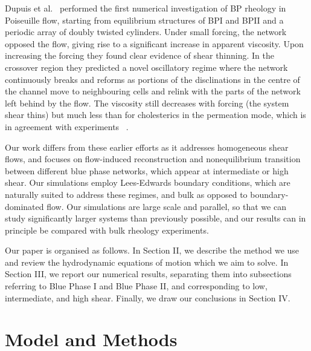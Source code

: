 \documentclass[8.5pt,twoside,twocolumn]{article}
\begin{document}
Dupuis et al.~\cite{Dupuis:2005} performed the first numerical investigation of BP rheology 
in Poiseuille flow, starting from equilibrium structures of BPI and BPII and a periodic 
array of doubly twisted cylinders.
Under small forcing, the network opposed the flow, giving rise to a significant 
increase in apparent viscosity.
Upon increasing the forcing they found clear evidence of shear thinning.
In the crossover region they predicted a novel oscillatory regime where the network 
continuously breaks and reforms as portions of the disclinations in the centre of the channel 
move to neighbouring cells and relink with the parts of the network left behind by the flow. 
The viscosity still decreases with forcing 
(the system shear thins) but much less than
for cholesterics in the permeation mode, which is in agreement with experiments
~\cite{Zapotocky:1999, Ramos:2002}.

Our work differs from these earlier efforts as it addresses homogeneous shear flows, 
and focuses on flow-induced reconstruction and nonequilibrium transition
between different blue phase networks, which appear at intermediate or
high shear. Our simulations employ Lees-Edwards boundary conditions, which
are naturally suited to address these regimes, and bulk as opposed
to boundary-dominated flow. 
Our simulations are large scale and parallel, so that we can study
significantly larger systems than previously possible, and our
results can in principle be compared with bulk rheology experiments. 

Our paper is organised as follows. 
In Section II, we describe the method we use and review
the hydrodynamic equations of motion which we aim to solve. In Section III, 
we report our numerical results, separating them into subsections referring to
Blue Phase I and Blue Phase II, and corresponding to low, intermediate, and
high shear. Finally, we draw our conclusions in Section IV.

\section{Model and Methods}
\end{document}
